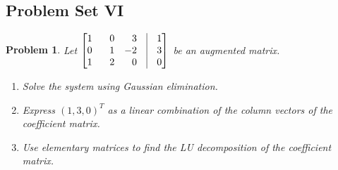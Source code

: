 \documentclass[oneside]{book}
\theoremstyle{mystyle}
\newtheorem{problem}{Problem}[section]
\begin{document}
\subsection{Problem Set VI}
\begin{problem}
Let $\begin{bmatrix*}[r] 1 & 0 & 3 & \vline & 1 \\ 0 & \phantom{-}1 & -2 & \vline & 3 \\ 1 & 2 & 0 & \vline & 0 \end{bmatrix*}$ be an augmented matrix.
\begin{enumerate}
    \item Solve the system using Gaussian elimination.
    \item Express $(1,3,0)^{T}$ as a linear combination of the column vectors of the coefficient matrix.
    \item Use elementary matrices to find the LU decomposition of the coefficient matrix.
\end{enumerate}
\end{problem}
\end{document}
